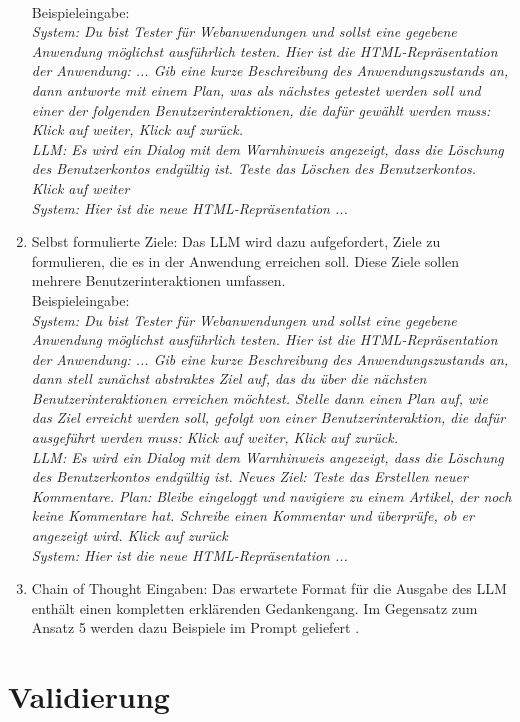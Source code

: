 \begin{enumerate}
    \\
    Beispieleingabe:
    \\
    \textit{System: Du bist Tester für Webanwendungen und sollst eine gegebene Anwendung möglichst ausführlich testen.
    Hier ist die HTML-Repräsentation der Anwendung: ... 
    Gib eine kurze Beschreibung des Anwendungszustands an, dann antworte mit einem Plan, was als nächstes getestet werden soll und einer der folgenden Benutzerinteraktionen, die dafür gewählt werden muss: Klick auf \dq weiter\dq, Klick auf \dq zurück\dq. 
    \\
    LLM: Es wird ein Dialog mit dem Warnhinweis angezeigt, dass die Löschung des Benutzerkontos endgültig ist.
    Teste das Löschen des Benutzerkontos.
    Klick auf \dq weiter\dq
    \\
    System: Hier ist die neue HTML-Repräsentation ...
    }
    \item Selbst formulierte Ziele: Das LLM wird dazu aufgefordert, Ziele zu formulieren, die es in der Anwendung erreichen soll. Diese Ziele sollen mehrere Benutzerinteraktionen umfassen.
    \\
    Beispieleingabe:
    \\
    \textit{System: Du bist Tester für Webanwendungen und sollst eine gegebene Anwendung möglichst ausführlich testen.
    Hier ist die HTML-Repräsentation der Anwendung: ... 
    Gib eine kurze Beschreibung des Anwendungszustands an, dann stell zunächst abstraktes Ziel auf, das du über die nächsten Benutzerinteraktionen erreichen möchtest.
    Stelle dann einen Plan auf, wie das Ziel erreicht werden soll, gefolgt von einer Benutzerinteraktion, die dafür ausgeführt werden muss: Klick auf \dq weiter\dq, Klick auf \dq zurück\dq. 
    \\
    LLM: Es wird ein Dialog mit dem Warnhinweis angezeigt, dass die Löschung des Benutzerkontos endgültig ist.
    Neues Ziel: Teste das Erstellen neuer Kommentare.
    Plan: Bleibe eingeloggt und navigiere zu einem Artikel, der noch keine Kommentare hat. Schreibe einen Kommentar und überprüfe, ob er angezeigt wird.
    Klick auf \dq zurück\dq
    \\
    System: Hier ist die neue HTML-Repräsentation ...
    }
    \item {} Chain of Thought Eingaben: Das erwartete Format für die Ausgabe des LLM enthält einen kompletten erklärenden Gedankengang. Im Gegensatz zum Ansatz 5 werden dazu Beispiele im Prompt geliefert \cite{chain-of-thought}.
\end{enumerate}

\section{Validierung}
\label{sec:vaildation}


